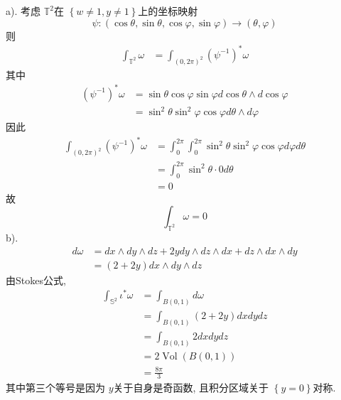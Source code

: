 \documentclass[../main.tex]{subfiles}
\begin{document}
\begin{solution}
a). 考虑 $\mathbb{T}^{2}$在 $\left\{ w\neq 1, y\neq 1 \right\}$上的坐标映射
 $$ \psi : \left(\cos\theta, \sin \theta, \cos \varphi ,\sin \varphi \right)\to \left(\theta ,\varphi \right) $$
则
 $$ \begin{aligned} \int _{\mathbb{T}^{2}}\omega &= \int _{\left(0,2\pi \right)^{2}}\left(\psi ^{-1} \right) ^{*}\omega  \end{aligned} $$
其中
 $$ \begin{aligned} \left(\psi ^{-1} \right)^{*}\omega& = \sin \theta \cos \varphi \sin \varphi d\cos \theta \wedge d\cos \varphi \\&= \sin ^{2}\theta \sin ^{2}\varphi \cos \varphi  d\theta \wedge d\varphi  \end{aligned} $$
因此
 $$ \begin{aligned} \int _{\left(0,2\pi \right)^{2}}\left(\psi ^{-1} \right)^{*}\omega& = \int _{0}^{2\pi }\int _{0}^{2\pi }\sin ^{2}\theta \sin ^{2}\varphi \cos \varphi d\varphi d\theta \\&= \int _{0}^{2\pi }\sin ^{2}\theta  \cdot 0 d\theta \\&= 0 \end{aligned} $$
故
 $$ \int _{\mathbb{T}^{2}}\omega = 0 $$
b).
 $$ \begin{aligned} d\omega & = dx\wedge dy\wedge dz+ 2ydy\wedge dz\wedge dx+ dz\wedge dx\wedge dy\\&=\left(2+ 2y\right)dx\wedge dy\wedge dz  \end{aligned} $$
由Stokes公式,
 $$ \begin{aligned} \int _{\mathbb{S}^{2}}\iota ^{*}\omega &= \int _{B\left(0,1\right)}d\omega \\&= \int _{B\left(0,1\right)}\left(2+ 2y\right)dxdydz\\&= \int _{B\left(0,1\right)}2dxdydz\\&= 2 \operatorname{Vol}\left(B\left(0,1\right)\right)\\&= \frac{8\pi  }{3 } \end{aligned} $$
其中第三个等号是因为 $y$关于自身是奇函数, 且积分区域关于 $\left\{ y= 0 \right\}$对称.
\end{solution}
\end{document}
